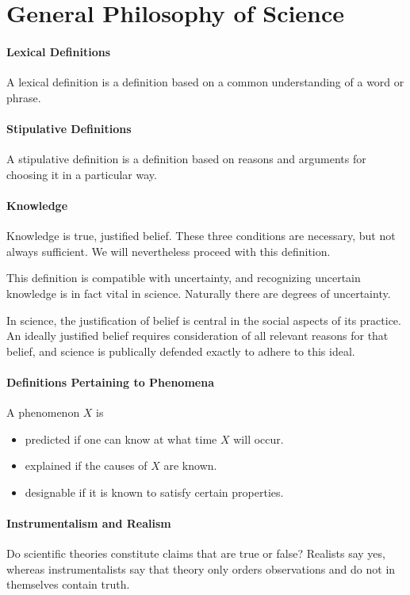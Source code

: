 \section{General Philosophy of Science}

\paragraph{Lexical Definitions}
A lexical definition is a definition based on a common understanding of a word or phrase.

\paragraph{Stipulative Definitions}
A stipulative definition is a definition based on reasons and arguments for choosing it in a particular way.

\paragraph{Knowledge}
Knowledge is true, justified belief. These three conditions are necessary, but not always sufficient. We will nevertheless proceed with this definition.

This definition is compatible with uncertainty, and recognizing uncertain knowledge is in fact vital in science. Naturally there are degrees of uncertainty.

In science, the justification of belief is central in the social aspects of its practice. An ideally justified belief requires consideration of all relevant reasons for that belief, and science is publically defended exactly to adhere to this ideal.

\paragraph{Definitions Pertaining to Phenomena}
A phenomenon $X$ is
\begin{itemize}
	\item predicted if one can know at what time $X$ will occur.
	\item explained if the causes of $X$ are known.
	\item designable if it is known to satisfy certain properties.
\end{itemize}

\paragraph{Instrumentalism and Realism}
Do scientific theories constitute claims that are true or false? Realists say yes, whereas instrumentalists say that theory only orders observations and do not in themselves contain truth.

